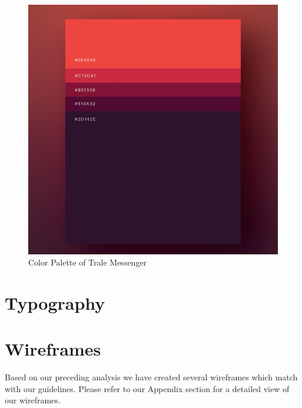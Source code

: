 \begin{figure}
    \centering
    \includegraphics[width=1.0\textwidth]{./images/colorPalette.png}
    \caption{Color Palette of Trale Messenger}
    \label{fig:colorPalette}
\end{figure}

\section{Typography}\label{sec:typography}

\section{Wireframes}\label{sec:wireframes}

Based on our preceding analysis we have created several wireframes which match with our guidelines.
Please refer to our Appendix section for a detailed view of our wireframes. %
